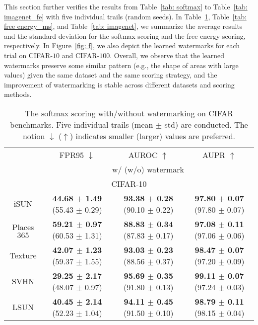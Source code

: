 \documentclass{article}
\begin{document}
This section further verifies the results from Table~\ref{tab: softmax} to Table~\ref{tab: imagenet_fe} with five individual trails (random seeds). In Table~\ref{tab: softmax_ms}, Table~\ref{tab: free energy_ms}, and Table~\ref{tab: imagenet}, we summarize the average results and the standard deviation for the softmax scoring and the free energy scoring, respectively. In Figure~\ref{fig: f}, we also depict the learned watermarks for each trial on CIFAR-$10$ and CIFAR-$100$.  Overall, we observe that the learned watermarks preserve some similar pattern (e.g., the shape of areas with large values) given the same dataset and the same scoring strategy, and the improvement of watermarking is stable across different datasets and scoring methods. 

\begin{table}[t]
\centering
\caption{The softmax scoring with/without watermarking on CIFAR benchmarks. Five individual trails (mean $\pm$ std) are conducted. The notion $\downarrow$ ($\uparrow$) indicates smaller (larger) values are preferred.} \label{tab: softmax_ms}
\vspace{5pt}
\scriptsize
{
\begin{tabular}{c|ccc}
\toprule[1.5pt]
                   & FPR95 $\downarrow$     & AUROC $\uparrow$       & AUPR $\uparrow$      \\
                   \cline{2-4} 
\multirow{-2}{*}{} & \multicolumn{3}{c}{w/ (w/o) watermark} \\
\midrule[0.6pt]
\multicolumn{4}{c}{\cellcolor{greyL}CIFAR-10} \\
\midrule[0.6pt]
iSUN               & \textbf{44.68 $\pm$ 1.49} (55.43 $\pm$ 0.29) & \textbf{93.38 $\pm$ 0.28} (90.10 $\pm$ 0.22) & \textbf{97.80 $\pm$ 0.07} (97.80 $\pm$ 0.07) \\ 
Places$365$        & \textbf{59.21 $\pm$ 0.97} (60.53 $\pm$ 1.31) & \textbf{88.83 $\pm$ 0.34} (87.83 $\pm$ 0.17) & \textbf{97.08 $\pm$ 0.11} (97.06 $\pm$ 0.06) \\
Texture            & \textbf{42.07 $\pm$ 1.23} (59.37 $\pm$ 1.55) & \textbf{93.03 $\pm$ 0.23} (88.56 $\pm$ 0.37) & \textbf{98.47 $\pm$ 0.07} (97.20 $\pm$ 0.09) \\
SVHN               & \textbf{29.25 $\pm$ 2.17} (48.07 $\pm$ 0.97) & \textbf{95.69 $\pm$ 0.35} (91.80 $\pm$ 0.13) & \textbf{99.11 $\pm$ 0.07} (97.24 $\pm$ 0.03) \\
LSUN             & \textbf{40.45 $\pm$ 2.14} (52.23 $\pm$ 1.04) & \textbf{94.11 $\pm$ 0.45} (91.50 $\pm$ 0.10) & \textbf{98.79 $\pm$ 0.11} (98.15 $\pm$ 0.04) \\

\end{tabular}}
\end{table}
\end{document}
